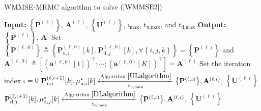 \documentclass[9pt,journal]{IEEEtran}
\newcommand{\paren}[1]{\left({#1}\right)}
\newcommand{\bracket}[1]{{\left [{#1}\right ]}}
\newcommand{\braces}[1]{{\left\{ {#1}\right\}}}
\theoremstyle{definition}
\begin{document}
\begin{algorithm}[ht!]
	\caption{WMMSE-MRMC algorithm to solve $\paren{\ref{WMMSE2}}$}
	\label{convexalgorithm}
	\begin{algorithmic}[1]
		\Statex \textbf{Input:} $\braces{\mathbf{P}^{\paren{\mathrm{\ell}}}}$, $\mathbf{A}^{\paren{\mathrm{\ell}}}$, $\braces{\mathbf{U}^{\paren{\mathrm{\ell}}}}$, $\mathrm{\iota}_{\textrm{max}}$, $\mathrm{t}_{\textrm{u,max}}$, and $\mathrm{t}_{\textrm{d,max}}$
		\Statex \textbf{Output: } $\braces{\mathbf{P}^{\paren{\ell}}}$, $\mathbf{A}^{\prime}$
		\State Set $\braces{\mathbf{P}^{\paren{\mathrm{\ell,0}}}}\triangleq\braces{\mathbf{P}^{\paren{\mathrm{\ell,0}}}_{\textrm{u},i}\bracket{k},\mathbf{P}^{\paren{\mathrm{\ell,0}}}_{\textrm{d},j}\bracket{k}, \forall \braces{i,j,k}}=\braces{\mathbf{P}^{\paren{\mathrm{\ell}}}}
		$ and $\mathbf{A}^{\paren{\mathrm{\ell,0}}}\triangleq\bracket{\paren{\mathbf{a}^{\paren{\mathrm{\ell,0}}}\bracket{1}}^\top;\cdots;\paren{\mathbf{a}^{\paren{\mathrm{\ell,0}}}\bracket{\mathrm{\mathit{K}}}}^\top}=\mathbf{A}^{\paren{\mathrm{\ell}}}$
		\State Set the iteration index $\mathrm{\iota}=0$ 
		\Repeat
		\label{stepk} %
		\State $\mathbf{P}^{\paren{\mathrm{\ell,\iota+1}}}_{\textrm{u},i}\bracket{k},\mu^\star_{\textrm{u},i}\bracket{k}\xleftarrow[\mathrm{t}_{\textrm{u,max}}]{\textrm{Algorithm }\ref{ULalgorithm}}\braces{\mathbf{P}^{\paren{\mathrm{\ell,\iota}}}},\mathbf{A}^{\paren{\mathrm{\ell,\iota}}}$, $\braces{\mathbf{U}^{\paren{\mathrm{\ell}}}}$
		\EndFor
		\State %
		$\mathbf{P}^{\paren{\mathrm{\ell,\iota+1}}}_{\textrm{d},j}\bracket{k},\mu^\star_{\textrm{d},j}\bracket{k}\xleftarrow[\mathrm{t}_{\textrm{d,max}}]{\textrm{Algorithm }\ref{DLalgorithm}}\braces{\mathbf{P}^{\paren{\mathrm{\ell,\iota}}}},\mathbf{A}^{\paren{\mathrm{\ell,\iota}}}$, $\braces{\mathbf{U}^{\paren{\mathrm{\ell}}}}$

\end{algorithmic}
\end{algorithm}
\end{document}
